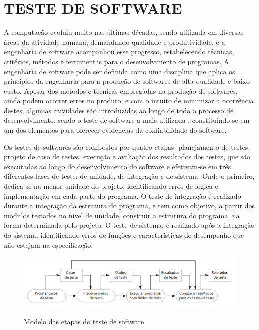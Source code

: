 \section{TESTE DE SOFTWARE}
\label{sec:testeDeSoftware} A computação evoluiu muito nas últimas décadas, sendo utilizada em diversas áreas da atividade humana, demandando qualidade e produtividade, e a engenharia de software acompanhou esse progresso, estabelecendo técnicas, critérios, métodos e ferramentas para o desenvolvimento de programas. A engenharia de software pode ser definida como uma disciplina que aplica os princípios da engenharia para a produção de softwares de alta qualidade e baixo custo\cite{Pressman1997}. Apesar dos métodos e técnicas empregadas na produção de softwares, ainda podem ocorrer erros no produto, e com o intuito de minimizar a ocorrência destes, algumas atividades são introduzidas ao longo de todo o processo de desenvolvimento, sendo o teste de software a mais utilizada \cite{Maldonado1997}, constituindo-se em um dos elementos para oferecer evidencias da confiabilidade do software.

Os testes de softwares são compostos por quatro etapas: planejamento de testes, projeto de caso de testes, execução e avaliação dos resultados dos testes, que são executadas ao longo do desenvolvimento do software e efetivam-se em três diferentes fases de teste: de unidade, de integração e de sistema. Onde o primeiro, dedica-se na menor unidade do projeto, identificando erros de lógica e implementação em cada parte do programa. O teste de integração é realizado durante a integração da estrutura do programa, e tem como objetivo, a partir dos módulos testados no nível de unidade, construir a estrutura do programa, na forma determinada pelo projeto. O teste de sistema, é realizado após a integração do sistema, identificando erros de funções e características de desempenho que não estejam na especificação.\cite{Maldonado2004}

\begin{figure}[!htb]
    \centering
    \caption{Modelo das etapas do teste de software}
    \includegraphics[width=1\textwidth]{./dados/figuras/Modelo_processo_de_software}
    \label{fig:figura-modelo-etapas-teste-de-software}
\end{figure}

